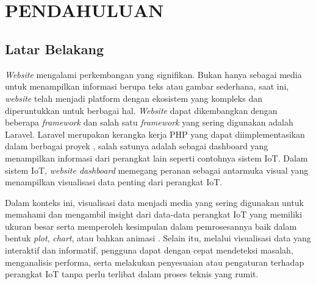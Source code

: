 \chapter[PENDAHULUAN]{\\ PENDAHULUAN}

\section{Latar Belakang}
\textit{Website} mengalami perkembangan yang signifikan. Bukan hanya sebagai media untuk menampilkan informasi berupa teks atau gambar sederhana, saat ini, \textit{website} telah menjadi platform dengan ekosistem yang kompleks dan diperuntukkan untuk berbagai hal. \textit{Website} dapat dikembangkan dengan beberapa \textit{framework} dan salah satu \textit{framework} yang sering digunakan adalah Laravel. Laravel merupakan kerangka kerja PHP yang dapat diimplementasikan dalam berbagai proyek \cite{Endra2021}, salah satunya adalah sebagai dashboard yang menampilkan informasi dari perangkat lain seperti contohnya sistem IoT. Dalam sistem IoT, \textit{website dashboard} memegang peranan sebagai antarmuka visual yang menampilkan visualisasi data penting dari perangkat IoT.

Dalam konteks ini, visualisasi data menjadi media yang sering digunakan untuk memahami dan mengambil insight dari data-data perangkat IoT yang memiliki ukuran besar serta memperoleh kesimpulan dalam pemrosesannya baik dalam bentuk \textit{plot}, \textit{chart}, atau bahkan animasi \cite{Mundargi2023}\cite{Bostrm2022}. Selain itu, melalui visualisasi data yang interaktif dan informatif, pengguna dapat dengan cepat mendeteksi masalah, menganalisis performa, serta melakukan penyesuaian atau pengaturan terhadap perangkat IoT tanpa perlu terlibat dalam proses teknis yang rumit. 

